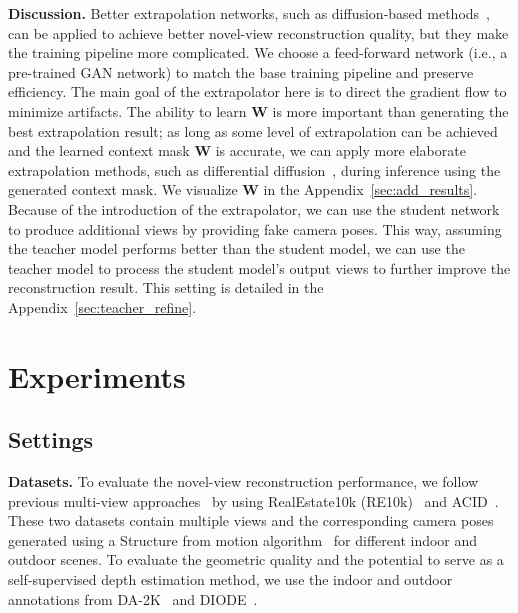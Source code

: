 \documentclass{article} %
\begin{document}
\textbf{Discussion.}
Better extrapolation networks, such as diffusion-based methods~\citep{lkwq007_stablediffusion-infinity}, can be applied to achieve better novel-view reconstruction quality, but they make the training pipeline more complicated. We choose a feed-forward network (i.e., a pre-trained GAN network) to match the base training pipeline and preserve efficiency. The main goal of the extrapolator here is to direct the gradient flow to minimize artifacts. The ability to learn $\bm W$ is more important than generating the best extrapolation result; as long as some level of extrapolation can be achieved and the learned context mask $\bm W$ is accurate, we can apply more elaborate extrapolation methods, such as differential diffusion~\citep{levin2023differential}, during inference using the generated context mask. We visualize $\bm W$ in the Appendix~\ref{sec:add_results}. Because of the introduction of the extrapolator, we can use the student network to produce additional views by providing fake camera poses. This way, assuming the teacher model performs better than the student model, we can use the teacher model to process the student model's output views to further improve the reconstruction result. This setting is detailed in the Appendix~\ref{sec:teacher_refine}.









\section{Experiments}
\subsection{Settings}
\textbf{Datasets.} To evaluate the novel-view reconstruction performance, we follow previous multi-view approaches~\citep{charatan2024pixelsplat,chen2024mvsplat} by using RealEstate10k (RE10k)~\citep{zhou2018stereo} and ACID~\citep{liu2021infinite}. These two datasets contain multiple views and the corresponding camera poses generated using a Structure from motion algorithm~\citep{schoenberger2016sfm} for different indoor and outdoor scenes. To evaluate the geometric quality and the potential to serve as a self-supervised depth estimation method, we use the indoor and outdoor annotations from DA-2K~\citep{yang2024depth} and DIODE~\citep{vasiljevic2019diode}.
\end{document}
